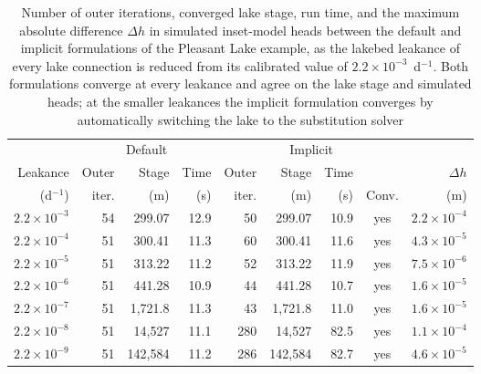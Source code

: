 \begin{table}[!ht]
	\caption[Comparison of the default and implicit lake formulations as lakebed leakance is reduced]{Number of outer iterations, converged lake stage, run time, and the maximum absolute difference $\Delta h$ in simulated inset-model heads between the default and implicit formulations of the Pleasant Lake example, as the lakebed leakance of every lake connection is reduced from its calibrated value of $2.2 \times 10^{-3}$~d$^{-1}$. Both formulations converge at every leakance and agree on the lake stage and simulated heads; at the smaller leakances the implicit formulation converges by automatically switching the lake to the substitution solver}
	\label{tab:lakedisconnect}
	\small
	\centering
	\begin{tabular}{r rrr rrrc r}
		\hline
		\hline
		& \multicolumn{3}{c}{Default} & \multicolumn{4}{c}{Implicit} & \\
		\cline{2-4} \cline{5-8}
		Leakance & Outer & Stage & Time & Outer & Stage & Time & & $\Delta h$ \\
		(d$^{-1}$) & iter. & (m) & (s) & iter. & (m) & (s) & Conv. & (m) \\
		\hline
		$2.2 \times 10^{-3}$ & 54 & 299.07 & 12.9 & 50 & 299.07 & 10.9 & yes & $2.2 \times 10^{-4}$ \\
		$2.2 \times 10^{-4}$ & 51 & 300.41 & 11.3 & 60 & 300.41 & 11.6 & yes & $4.3 \times 10^{-5}$ \\
		$2.2 \times 10^{-5}$ & 51 & 313.22 & 11.2 & 52 & 313.22 & 11.9 & yes & $7.5 \times 10^{-6}$ \\
		$2.2 \times 10^{-6}$ & 51 & 441.28 & 10.9 & 44 & 441.28 & 10.7 & yes & $1.6 \times 10^{-5}$ \\
		$2.2 \times 10^{-7}$ & 51 & 1{,}721.8 & 11.3 & 43 & 1{,}721.8 & 11.0 & yes & $1.6 \times 10^{-5}$ \\
		$2.2 \times 10^{-8}$ & 51 & 14{,}527 & 11.1 & 280 & 14{,}527 & 82.5 & yes & $1.1 \times 10^{-4}$ \\
		$2.2 \times 10^{-9}$ & 51 & 142{,}584 & 11.2 & 286 & 142{,}584 & 82.7 & yes & $4.6 \times 10^{-5}$ \\
		\hline
		\hline
	\end{tabular}
\end{table}

